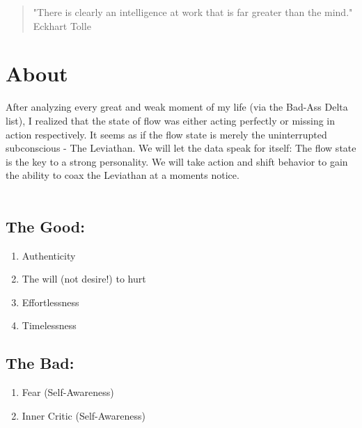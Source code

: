 \documentclass[12pt]{article}
\begin{document}
\author{}
\date{}
\maketitle
{}
\begin{quote}{\large}
"There is clearly an intelligence at work that is far greater than the mind."\\
\textemdash Eckhart Tolle
\end{quote}

\pagebreak

\section*{About}

After analyzing every great and weak moment of my life (via the Bad-Ass Delta list), I realized that the state of flow was either acting perfectly or missing in action respectively.  It seems as if the flow state is merely the uninterrupted subconscious - The Leviathan.  We will let the data speak for itself: The flow state is the key to a strong personality.  We will take action and shift behavior to gain the ability to coax the Leviathan at a moments notice.  
\\
\\

\begin{multicols}{2}
\subsection*{The Good:}

\begin{enumerate}
	\item Authenticity
	\item The will (not desire!) to hurt
	\item Effortlessness
	\item Timelessness
\end{enumerate}


\subsection*{The Bad:}

\begin{enumerate}
	\item Fear (Self-Awareness)
	\item Inner Critic (Self-Awareness)

\end{enumerate}
\vfill\null
\end{multicols}
\end{document}
